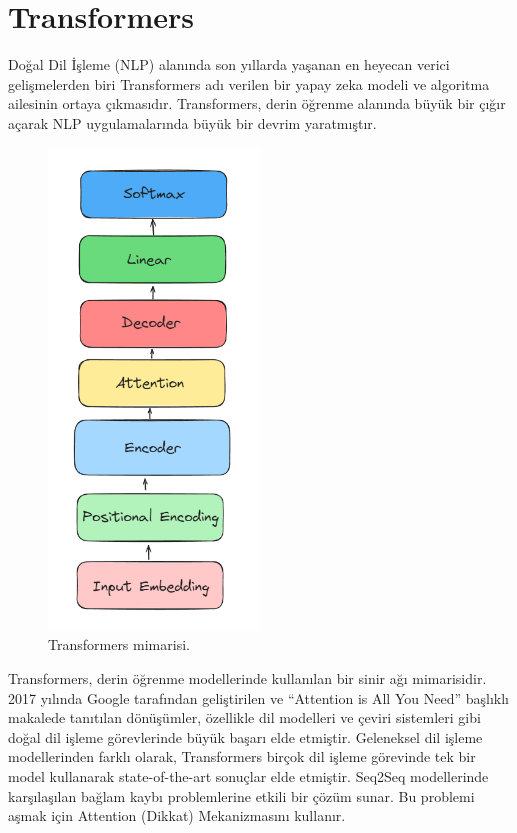 \section{Transformers}
Doğal Dil İşleme (NLP) alanında son yıllarda yaşanan en heyecan verici gelişmelerden biri Transformers adı verilen bir yapay zeka modeli ve algoritma ailesinin ortaya çıkmasıdır. Transformers, derin öğrenme alanında büyük bir çığır açarak NLP uygulamalarında büyük bir devrim yaratmıştır.

\begin{figure}[ht]
    \centering
    \includegraphics[width=0.5\textwidth]{images/transformer_architecture.png}
    \caption{Transformers mimarisi.}
    \label{fig:enter-label}
\end{figure}

Transformers, derin öğrenme modellerinde kullanılan bir sinir ağı mimarisidir. 2017 yılında Google tarafından geliştirilen ve “Attention is All You Need” başlıklı makalede tanıtılan dönüşümler, özellikle dil modelleri ve çeviri sistemleri gibi doğal dil işleme görevlerinde büyük başarı elde etmiştir. Geleneksel dil işleme modellerinden farklı olarak, Transformers birçok dil işleme görevinde tek bir model kullanarak state-of-the-art sonuçlar elde etmiştir. Seq2Seq modellerinde karşılaşılan bağlam kaybı problemlerine etkili bir çözüm sunar. Bu problemi aşmak için Attention (Dikkat) Mekanizmasını kullanır.

